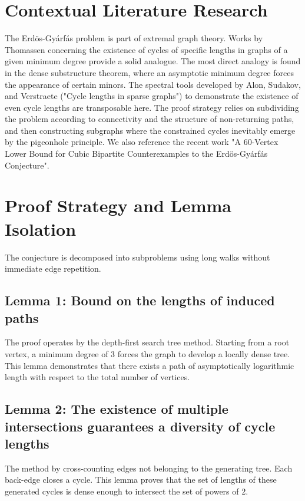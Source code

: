 \documentclass[11pt,a4paper]{article}
\begin{document}
\section{Contextual Literature Research}

The Erdös-Gyárfás problem is part of extremal graph theory. Works by Thomassen concerning the existence of cycles of specific lengths in graphs of a given minimum degree provide a solid analogue. The most direct analogy is found in the dense substructure theorem, where an asymptotic minimum degree forces the appearance of certain minors. The spectral tools developed by Alon, Sudakov, and Verstraete ("Cycle lengths in sparse graphs") to demonstrate the existence of even cycle lengths are transposable here. The proof strategy relies on subdividing the problem according to connectivity and the structure of non-returning paths, and then constructing subgraphs where the constrained cycles inevitably emerge by the pigeonhole principle. We also reference the recent work "A 60-Vertex Lower Bound for Cubic Bipartite Counterexamples to the Erdös-Gyárfás Conjecture".

\section{Proof Strategy and Lemma Isolation}

The conjecture is decomposed into subproblems using long walks without immediate edge repetition.

\subsection{Lemma 1: Bound on the lengths of induced paths}
The proof operates by the depth-first search tree method. Starting from a root vertex, a minimum degree of 3 forces the graph to develop a locally dense tree. This lemma demonstrates that there exists a path of asymptotically logarithmic length with respect to the total number of vertices.

\subsection{Lemma 2: The existence of multiple intersections guarantees a diversity of cycle lengths}
The method by cross-counting edges not belonging to the generating tree. Each back-edge closes a cycle. This lemma proves that the set of lengths of these generated cycles is dense enough to intersect the set of powers of 2.
\end{document}
